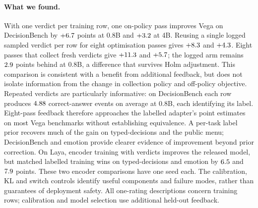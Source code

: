 \paragraph{What we found.}
With one verdict per training row, one on-policy pass improves Vega on DecisionBench by $+6.7$ points at 0.8B and $+3.2$ at 4B. Reusing a single logged sampled verdict per row for eight optimisation passes gives $+8.3$ and $+4.3$. Eight passes that collect fresh verdicts give $+11.3$ and $+5.7$; the logged arm remains $2.9$ points behind at 0.8B, a difference that survives Holm adjustment. This comparison is consistent with a benefit from additional feedback, but does not isolate information from the change in collection policy and off-policy objective. Repeated verdicts are particularly informative: on DecisionBench each row produces $4.88$ correct-answer events on average at 0.8B, each identifying its label. Eight-pass feedback therefore approaches the labelled adapter's point estimates on most Vega benchmarks without establishing equivalence. A per-task label prior recovers much of the gain on typed-decisions and the public menu; DecisionBench and emotion provide clearer evidence of improvement beyond prior correction. On Laya, encoder training with verdicts improves the released model, but matched labelled training wins on typed-decisions and emotion by $6.5$ and $7.9$ points. These two encoder comparisons have one seed each. The calibration, KL and switch controls identify useful components and failure modes, rather than guarantees of deployment safety. All one-rating descriptions concern training rows; calibration and model selection use additional held-out feedback.
